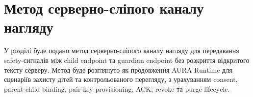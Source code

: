 \chapter{Метод серверно-сліпого каналу нагляду}

У розділі буде подано метод серверно-сліпого каналу нагляду для передавання safety-сигналів між child endpoint та guardian endpoint без розкриття відкритого тексту серверу. Метод буде розглянуто як продовження AURA Runtime для сценаріїв захисту дітей та контрольованого перегляду, з урахуванням consent, parent-child binding, pair-key provisioning, ACK, revoke та purge lifecycle.
